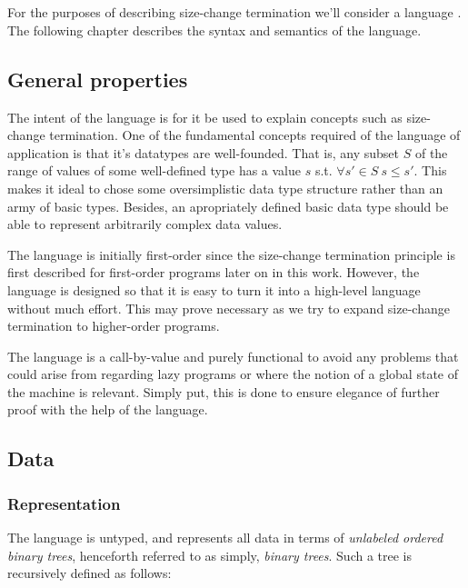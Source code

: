 \chapter{}

For the purposes of describing size-change termination we'll consider a language
. The following chapter describes the syntax and semantics of the
language.

\section{General properties}

The intent of the language is for it be used to explain concepts such as
size-change termination. One of the fundamental concepts required of the
language of application is that it's datatypes are well-founded. That is, any
subset $S$ of the range of values of some well-defined type has a value $s$
s.t. $\forall {s'\in S}\ s\leq s'$. This makes it ideal to chose some
oversimplistic data type structure rather than an army of basic types. Besides,
an apropriately defined basic data type should be able to represent arbitrarily
complex data values.

The language is initially first-order since the size-change termination
principle is first described for first-order programs later on in this work.
However, the language is designed so that it is easy to turn it into a
high-level language without much effort. This may prove necessary as we try to
expand size-change termination to higher-order programs.

The language is a call-by-value and purely functional to avoid any problems
that could arise from regarding lazy programs or where the notion of a global
state of the machine is relevant. Simply put, this is done to ensure elegance
of further proof with the help of the language.

\section{Data}

\subsection{Representation}\label{section:d-data-representation}

The language  is untyped, and represents all data in terms of
\emph{unlabeled ordered binary trees}, henceforth referred to as simply,
\emph{binary trees}. Such a tree is recursively defined as follows:

